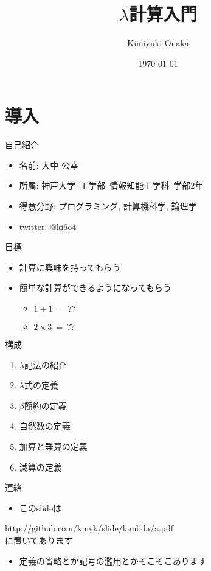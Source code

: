 \documentclass[pdflatex,17pt]{beamer}
\title{$\lambda$計算入門}
\author{Kimiyuki Onaka}
\date{\today}
\begin{document}
\maketitle

\section{導入}
\begin{frame}{自己紹介}
    \begin{itemize}
        \item 名前: 大中 公幸
        \item 所属: 神戸大学~工学部~情報知能工学科~学部2年
        \item 得意分野: プログラミング, 計算機科学, 論理学
        \item twitter: @ki6o4
    \end{itemize}
\end{frame}

\begin{frame}{目標}
    \begin{itemize}
        \item 計算に興味を持ってもらう
        \item 簡単な計算ができるようになってもらう
        \begin{itemize}
            \item $1 + 1~=~??$
            \item $2 \times 3~=~??$
        \end{itemize}
    \end{itemize}
\end{frame}

\begin{frame}{構成}
    \begin{enumerate}
        \item $\lambda$記法の紹介
        \item $\lambda$式の定義
        \item $\beta$簡約の定義
        \item 自然数の定義
        \item 加算と乗算の定義
        \item 減算の定義
    \end{enumerate}
\end{frame}

\begin{frame}{連絡}
    \begin{itemize}
        \item このslideは
    \end{itemize}
     {\rm http://github.com/kmyk/slide/lambda/a.pdf} \\ に置いてあります
    \begin{itemize}
        \item 定義の省略とか記号の濫用とかそこそこあります
    \end{itemize}
\end{frame}
\end{document}
